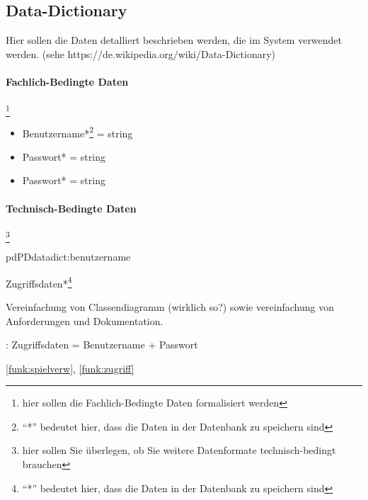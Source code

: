 \subsection{Data-Dictionary}

Hier sollen die Daten detalliert beschrieben werden, die im System verwendet werden. (sehe https://de.wikipedia.org/wiki/Data-Dictionary)

\paragraph{Fachlich-Bedingte Daten}\footnote{hier sollen die Fachlich-Bedingte Daten formalisiert werden}

\begin{itemize}
	\item[\ref{daten:benutzername}] Benutzername*\footnote{``*'' bedeutet hier, dass die Daten in der Datenbank zu speichern sind} = string
	\item[\ref{daten:benutzername}] Passwort* = string
	\item[\ref{daten:benutzername}] Passwort* = string
\end{itemize}

\paragraph{Technisch-Bedingte Daten}\footnote{hier sollen Sie überlegen, ob Sie weitere Datenformate technisch-bedingt brauchen}

\setcounter{pd}{10}

\begin{description}[leftmargin=5em, style=sameline]
	
	\begin{lhp}{pd}{PD}{datadict:benutzername}
		\item [Name:] Zugriffsdaten*\footnote{``*'' bedeutet hier, dass die Daten in der Datenbank zu speichern sind}
		\item [Motivation:] Vereinfachung von Classendiagramm (wirklich so?) sowie vereinfachung von Anforderungen und Dokumentation.
		\item [Data-Dictionary Ausdruck]: Zugriffsdaten = Benutzername + Passwort
		\item [Relevante Systemfunktionen:]  \ref{funk:spielverw}, \ref{funk:zugriff}
	\end{lhp}
\end{description}